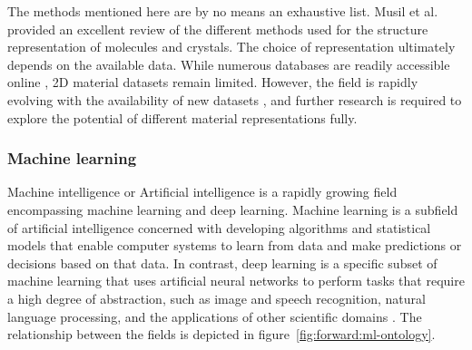 The methods mentioned here are by no means an exhaustive list. Musil et al. \cite{doi:10.1021/acs.chemrev.1c00021} provided an excellent review of the different methods used for the structure representation of molecules and crystals. The choice of representation ultimately depends on the available data. While numerous databases are readily accessible online \cite{choudhary2022recent}, 2D material datasets remain limited. However, the field is rapidly evolving with the availability of new datasets \cite{haastrup2018computational, gjerding2021recent, huang2023unveiling}, and further research is required to explore the potential of different material representations fully.



\subsubsection{Machine learning}
\label{subsec:forward:ml}



Machine intelligence or Artificial intelligence is a rapidly growing field encompassing machine learning and deep learning. Machine learning is a subfield of artificial intelligence concerned with developing algorithms and statistical models that enable computer systems to learn from data and make predictions or decisions based on that data. In contrast, deep learning is a specific subset of machine learning that uses artificial neural networks to perform tasks that require a high degree of abstraction, such as image and speech recognition, natural language processing, and the applications of other scientific domains \cite{Goodfellow-et-al-2016}. The relationship between the fields is depicted in figure~\ref{fig:forward:ml-ontology}.


